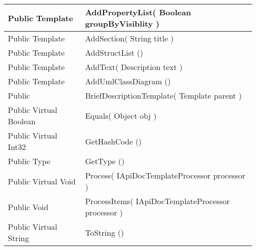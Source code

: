 \documentclass[11pt, oneside, a4paper]{book}
\begin{document}
\begin{center}
\begin{tabular}{| p{3cm} | p{12cm} | }
\hline
 Public  Template &  AddPropertyList(\hypertarget{SoftwareEngineeringTools.{}Documentation.{}BriefDescriptionTemplate.{}AddPropertyList\_Boolean}{} Boolean  groupByVisiblity  )\\
\hline
 Public  Template &  AddSection(\hypertarget{SoftwareEngineeringTools.{}Documentation.{}BriefDescriptionTemplate.{}AddSection\_String}{} String  title  )\\
\hline
 Public  Template &  AddStructList ()\hypertarget{SoftwareEngineeringTools.{}Documentation.{}BriefDescriptionTemplate.{}AddStructList}{}\\
\hline
 Public  Template &  AddText(\hypertarget{SoftwareEngineeringTools.{}Documentation.{}BriefDescriptionTemplate.{}AddText\_Description}{} Description  text  )\\
\hline
 Public  Template &  AddUmlClassDiagram ()\hypertarget{SoftwareEngineeringTools.{}Documentation.{}BriefDescriptionTemplate.{}AddUmlClassDiagram}{}\\
\hline
 Public  &  BriefDescriptionTemplate(\hypertarget{SoftwareEngineeringTools.{}Documentation.{}BriefDescriptionTemplate.{}BriefDescriptionTemplate\_Template}{} Template  parent  )\\
\hline
 Public  Virtual  Boolean &  Equals(\hypertarget{SoftwareEngineeringTools.{}Documentation.{}BriefDescriptionTemplate.{}Equals\_Object}{} Object  obj  )\\
\hline
 Public  Virtual  Int32 &  GetHashCode ()\hypertarget{SoftwareEngineeringTools.{}Documentation.{}BriefDescriptionTemplate.{}GetHashCode}{}\\
\hline
 Public  Type &  GetType ()\hypertarget{SoftwareEngineeringTools.{}Documentation.{}BriefDescriptionTemplate.{}GetType}{}\\
\hline
 Public  Virtual  Void &  Process(\hypertarget{SoftwareEngineeringTools.{}Documentation.{}BriefDescriptionTemplate.{}Process\_IApiDocTemplateProcessor}{} IApiDocTemplateProcessor  processor  )\\
\hline
 Public  Void &  ProcessItems(\hypertarget{SoftwareEngineeringTools.{}Documentation.{}BriefDescriptionTemplate.{}ProcessItems\_IApiDocTemplateProcessor}{} IApiDocTemplateProcessor  processor  )\\
\hline
 Public  Virtual  String &  ToString ()\hypertarget{SoftwareEngineeringTools.{}Documentation.{}BriefDescriptionTemplate.{}ToString}{}\\
\hline
\end{tabular}
\end{center}
 
\end{document}
